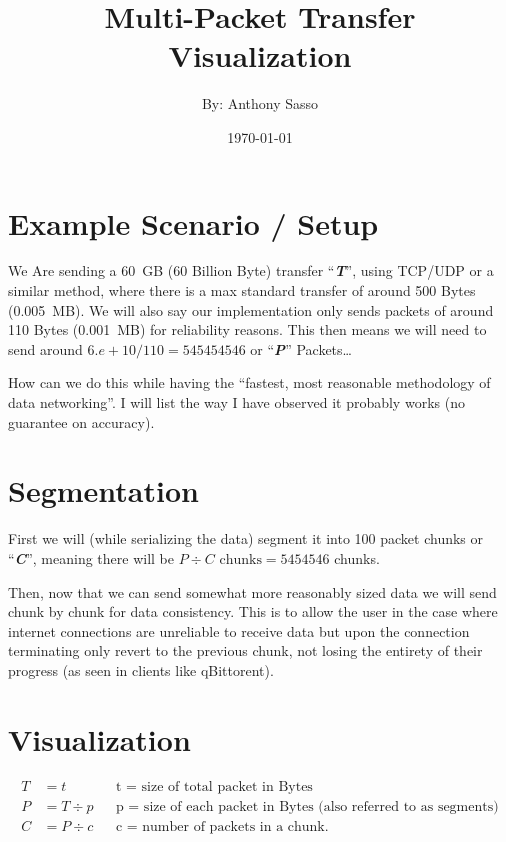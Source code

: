 \documentclass{article}
\title{\Huge Multi-Packet Transfer Visualization}
\author{By: Anthony Sasso}
\date{\today}
\newcommand{\textbfit}[1]{\textbf{\textit{#1}}} %
\begin{document}
    
    \maketitle

    \tableofcontents

    \newpage
    \section*{Example Scenario / Setup}

    We Are sending a 60 GB (60 Billion Byte) transfer ``\textbfit{T}'', using TCP/UDP or a similar method, where there is a max standard transfer of around 500 Bytes (0.005 MB). We will also say our implementation only sends packets of around 110 Bytes (0.001 MB) for reliability reasons. This then means we will need to send around \( 6.e+10 / 110 = 545 454 546\) or ``\textbfit{P}'' Packets…

    \bigskip
    How can we do this while having the ``fastest, most reasonable methodology of data networking''. I will list the way I have observed it probably works (no guarantee on accuracy).

    \section{Segmentation}

    First we will (while serializing the data) segment it into 100 packet chunks or ``\textbfit{C}'', meaning there will be \(P \div C \text{ chunks} = 5 454 546\) chunks.

    \bigskip
    Then, now that we can send somewhat more reasonably sized data we will send chunk by chunk for data consistency. This is to allow the user in the case where internet connections are unreliable to receive data but upon the connection terminating only revert to the previous chunk, not losing the entirety of their progress (as seen in clients like qBittorent).

    \section{Visualization}
    \begin{align}
        T &= t&&\text{t = size of total packet in Bytes}\\
        P &= T \div p&&\text{p = size of each packet in Bytes (also referred to as segments)}\\
        C &= P \div c&&\text{c = number of packets in a chunk.}
    \end{align}
\end{document}
